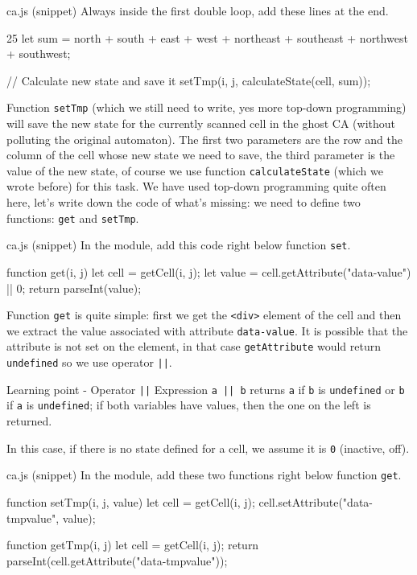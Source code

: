 \begin{programcode}{ca.js (snippet)}
Always inside the first double loop, add these lines at the end.
\begin{codeh1}{2}{5}
let sum = north + south + east + west + northeast + southeast + northwest + southwest;

// Calculate new state and save it
setTmp(i, j, calculateState(cell, sum));
\end{codeh1}
\end{programcode}

Function \texttt{setTmp} (which we still need to write, yes more top-down programming) will save the new state
for the currently scanned cell in the ghost CA (without polluting the original automaton).
The first two parameters are the row and the column of the cell whose
new state we need to save, the third parameter is the value of the new state, of course we use function
\texttt{calculateState} (which we wrote before) for this task. We have used top-down programming quite often here,
let's write down the code of what's missing: we need to define two functions: \texttt{get} and \texttt{setTmp}.

\begin{programcode}{ca.js (snippet)}
In the module, add this code right below function \texttt{set}.
\begin{code}
function get(i, j) {
  let cell = getCell(i, j);
  let value = cell.getAttribute("data-value") || 0;
  return parseInt(value);
}
\end{code}
\end{programcode}

Function \texttt{get} is quite simple: first we get the \texttt{<div>} element of the cell and then we
extract the value associated with attribute \texttt{data-value}. It is possible that the attribute
is not set on the element, in that case \texttt{getAttribute} would return \texttt{undefined} so we
use operator \texttt{||}.

\begin{tips}{Learning point - Operator \texttt{||}}
Expression \texttt{a || b} returns \texttt{a} if \texttt{b} is \texttt{undefined}
or \texttt{b} if \texttt{a} is \texttt{undefined}; if both variables have values, then the one on the
left is returned.
\end{tips}

In this case, if there is no state defined for a cell, we assume it is \texttt{0}
(inactive, off).

\begin{programcode}{ca.js (snippet)}
In the module, add these two functions right below function \texttt{get}.
\begin{code}
function setTmp(i, j, value) {
  let cell = getCell(i, j);
  cell.setAttribute("data-tmpvalue", value);
}

function getTmp(i, j) {
  let cell = getCell(i, j);
  return parseInt(cell.getAttribute("data-tmpvalue"));
}
\end{code}
\end{programcode}

